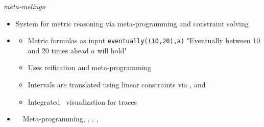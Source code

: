 \begin{frame}{\textit{meta-melingo}}
  \begin{itemize}
    \item {} System for metric reasoning via meta-programming and constraint solving
    \item {}
      \begin{itemize}
      \item Metric formulas as input \texttt{eventually((10,20),a)} "Eventually between 10 and 20 times ahead $a$ will hold"
      \item Uses reification and meta-programming
      \item Intervals are translated using linear constraints via \flingo, \clingodl and \clingcon
      \item Integrated \clingraph\ visualization for traces
      \end{itemize}
    \item {} \ \clingo\ Meta-programming, \flingo, \clingodl, \clingcon, \clingraph
  \end{itemize}
\end{frame}
%
